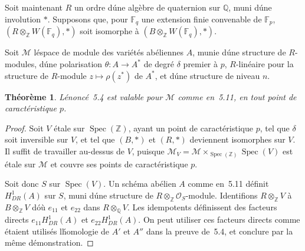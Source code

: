 \documentclass[11pt,a4paper]{article}
\theoremstyle{plain}
\newtheorem{theorem}{Th\'eor\`eme}
\theoremstyle{definition}
\DeclareMathOperator{\Spec}{Spec}
\begin{document}
\subsection{}

Soit maintenant $R$ un ordre d\'une alg\`ebre de quaternion sur $\mathbb{Q}$, muni
d\'une involution $*$. Supposons que, pour $\mathbb{F}_q$ une extension finie convenable de
$\mathbb{F}_p$, $(R \otimes_\mathbb{Z} W(\mathbb{F}_q), *)$ soit isomorphe \`a $(B \otimes_\mathbb{Z} W(\mathbb{F}_q), *)$.

Soit $\mathscr{M}$ l\'espace de module des vari\'et\'es ab\'eliennes $A$, munie d\'une structure
de $R$-modules, d\'une polarisation $\theta: A \to A^*$ de degr\'e $\delta$ premier \`a $p$, $R$-lin\'eaire
pour la structure de $R$-module $z \mapsto \rho(z^*)$ de $A^*$, et d\'une structure de niveau $n$.

\begin{theorem}
L\'enonc\'e~5.4 est valable pour $\mathscr{M}$ comme en~5.11, en tout
point de caract\'eristique $p$.
\end{theorem}

\begin{proof}
Soit $V$ \'etale sur $\Spec(\mathbb{Z})$, ayant un point de caract\'eristique $p$, tel que
$\delta$ soit inversible sur $V$, et tel que $(B, *)$ et $(R, *)$ deviennent isomorphes sur $V$.
Il suffit de travailler au-dessus de $V$, puisque $\mathscr{M}_V = \mathscr{M} \times_{\Spec(\mathbb{Z})} \Spec(V)$ est \'etale sur
$\mathscr{M}$ et couvre ses points de caract\'eristique $p$.

Soit donc $S$ sur $\Spec(V)$. Un sch\'ema ab\'elien $A$ comme en~5.11 d\'efinit $H^1_{DR}(A)$
sur $S$, muni d\'une structure de $R \otimes_\mathbb{Z} \mathscr{O}_S$-module. Identifions $R \otimes_\mathbb{Z} V$ \`a $B \otimes_\mathbb{Z} V$
d\'o\`u $e_{11}$ et $e_{22}$ dans $R \otimes_\mathbb{Q} V$. Les idempotents d\'efinissent des facteurs directs $e_{11}H^1_{DR}(A)$
et $e_{22}H^1_{DR}(A)$. On peut utiliser ces facteurs directs comme \'etaient utilis\'es
l\'homologie de $A'$ et $A''$ dans la preuve de~5.4, et conclure par la m\^eme
d\'emonstration.
\end{proof}
\end{document}
